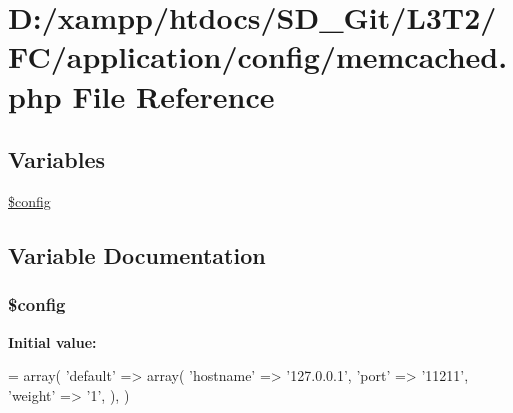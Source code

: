 \hypertarget{memcached_8php}{}\section{D\+:/xampp/htdocs/\+S\+D\+\_\+\+Git/\+L3\+T2/\+F\+C/application/config/memcached.php File Reference}
\label{memcached_8php}
\subsection*{Variables}
\begin{DoxyCompactItemize}
\item 
\hyperlink{memcached_8php_a49c7011be9c979d9174c52a8b83e5d8e}{\$config}
\end{DoxyCompactItemize}


\subsection{Variable Documentation}
\hypertarget{memcached_8php_a49c7011be9c979d9174c52a8b83e5d8e}{}
\subsubsection[{\$config}]{\setlength{\rightskip}{0pt plus 5cm}\$config}\label{memcached_8php_a49c7011be9c979d9174c52a8b83e5d8e}
{\bfseries Initial value\+:}
\begin{DoxyCode}
= array(
    \textcolor{stringliteral}{'default'} => array(
        \textcolor{stringliteral}{'hostname'} => \textcolor{stringliteral}{'127.0.0.1'},
        \textcolor{stringliteral}{'port'}     => \textcolor{stringliteral}{'11211'},
        \textcolor{stringliteral}{'weight'}   => \textcolor{charliteral}{'1'},
    ),
)
\end{DoxyCode}
